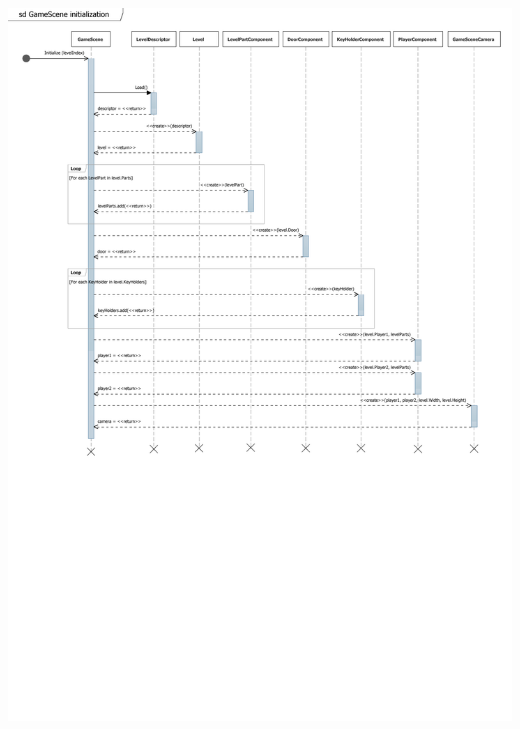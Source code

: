 \begin{center}
\includegraphics[scale=0.8]{11_SD3_GameSceneInitialization.pdf}
\newpage

\end{center}
